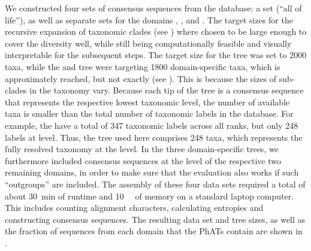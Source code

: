 We constructed four sets of consensus sequences from the  database:
a  set (``all of life''),
as well as separate sets for the domains , , and .
The target sizes for the recursive expansion of taxonomic clades
(see )
where chosen to be large enough to cover the diversity well,
while still being computationally feasible and visually interpretable for the subsequent steps.
The target size for the  tree was set to \num{2 000} taxa,
while the  and  tree were targeting \num{1 800} domain-specific taxa,
which is approximately reached, but not exactly (see ).
This is because the sizes of sub-clades in the taxonomy vary.
Because each tip of the tree is a consensus sequence that represents the respective lowest taxonomic level,
the number of available taxa is smaller than the total number of taxonomic labels in the  database.
For example, the  have a total of  \num{347} taxonomic labels across all ranks,
but only \num{248} labels at  level.
Thus, the  tree used here comprises \num{248} taxa,
which represents the fully resolved  taxonomy at the  level.
In the three domain-specific trees, we furthermore included consensus sequences at the  level
of the respective two remaining domains,
in order to make sure that the evaluation also works if such ``outgroups'' are included.
The assembly of these four data sets required a total of
about \SI{30}{\minute} of runtime and \SI{10}{\giga\byte} of memory on a standard laptop computer.
This includes counting alignment characters, calculating entropies and constructing consensus sequences.
The resulting data set and tree sizes, as well as the fraction of sequences from each domain that the \acp{PhAT} contain
are shown in .

